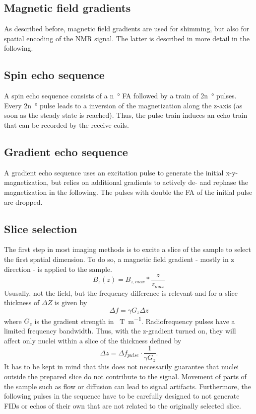         \subsection{Magnetic field gradients}
            As described before, magnetic field gradients are used for shimming, but also for spatial encoding of the NMR signal. The latter is described in more detail in the following.
        \subsection{Spin echo sequence}
        A spin echo sequence consists of a n\SI{}{\degree} FA followed by a train of 2n\SI{}{\degree} pulses. Every 2n\SI{}{\degree} pulse leads to a inversion of the magnetization along the z-axis (as soon as the steady state is reached). Thus, the pulse train induces an echo train that can be recorded by the receive coils.
        \subsection{Gradient echo sequence}
        A gradient echo sequence uses an excitation pulse to generate the initial x-y-magnetization, but relies on additional gradients to actively de- and rephase the magnetization in the following. The pulses with double the FA of the initial pulse are dropped.
        \subsection{Slice selection}
            The first step in most imaging methods is to excite a slice of the sample to select the first spatial dimension. To do so, a magnetic field gradient - mostly in z direction - is applied to the sample. 
            \begin{equation}
                B_z(z) = B_{z,max} * \frac{z}{z_{max}}
            \end{equation}
            Ususally, not the field, but the frequency difference is relevant and for a slice thickness of $\Delta Z$ is given by 
            \begin{equation}
                \Delta f = \gamma G_z \Delta z
            \end{equation}
            where $G_z$ is the gradient strength in \SI{}{\tesla\per\meter}.
            Radiofrequency pulses have a limited frequency bandwidth. Thus, with the z-gradient turned on, they will affect only nuclei within a slice of the thickness defined by
            \begin{equation}
                \Delta z = \Delta f_{pulse} \cdot \frac{1}{\gamma G_z}.
            \end{equation}
             It has to be kept in mind that this does not necessarily guarantee that nuclei outside the prepared slice do not contribute to the signal. Movement of parts of the sample such as flow or diffusion can lead to signal artifacts. Furthermore, the following pulses in the sequence have to be carefully designed to not generate FIDs or echos of their own that are not related to the originally selected slice.
